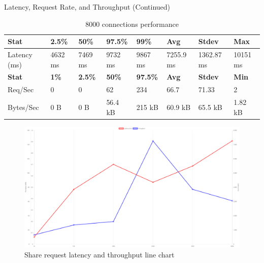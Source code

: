 \documentclass[../Main.tex]{subfiles}
\begin{document}
\begin{table}[H]
\centering
\caption{Latency, Request Rate, and Throughput (Continued)}
\begin{tabular}{|l|l|l|l|l|l|l|l|}
\hline
\rowcolor[HTML]{f56b00}
\textbf{Stat} & \textbf{2.5\%} & \textbf{50\%} & \textbf{97.5\%} & \textbf{99\%} & \textbf{Avg} & \textbf{Stdev} & \textbf{Max} \\ \hline
Latency (ms) & 4632 ms & 7469 ms & 9732 ms & 9867 ms & 7255.9 ms & 1362.87 ms & 10151 ms \\ \hline
\rowcolor[HTML]{f56b00}
\textbf{Stat} & \textbf{1\%} & \textbf{2.5\%} & \textbf{50\%} & \textbf{97.5\%} & \textbf{Avg} & \textbf{Stdev} & \textbf{Min} \\ \hline
Req/Sec & 0 & 0 & 62 & 234 & 66.7 & 71.33 & 2 \\ \hline
Bytes/Sec & 0 B & 0 B & 56.4 kB & 215 kB & 60.9 kB & 65.5 kB & 1.82 kB \\ \hline
\end{tabular}
 \caption{8000 connections performance}
 \label{8000-connections-performance}
\end{table}

\begin{figure}[H]
  \centering
  \includegraphics[scale=0.22]{Figure/sharerequest-line-chart.png}
  \caption{Share request latency and throughput line chart}
  \label{fig:sharerequest-line-chart}
\end{figure}
\end{document}
